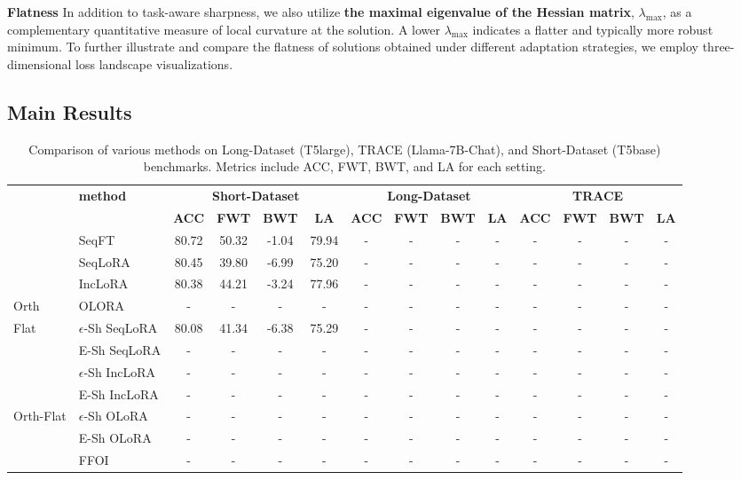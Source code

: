 \documentclass[letterpaper]{article} %
\begin{document}
\textbf{Flatness}
In addition to task-aware sharpness, we also utilize \textbf{the maximal eigenvalue of the Hessian matrix}, $\lambda_{\max}$, as a complementary quantitative measure of local curvature at the solution. A lower $\lambda_{\max}$ indicates a flatter and typically more robust minimum. To further illustrate and compare the flatness of solutions obtained under different adaptation strategies, we employ three-dimensional loss landscape visualizations\cite{liVisualizingLossLandscape2018}.

\subsection{Main Results}





\begin{table}[thbp]
\centering
\begin{tabular}{llcccccccccccc}
\toprule
 & \multirow{2}{*}{\textbf{method}} 
    & \multicolumn{4}{c}{\textbf{Short-Dataset}} 
    & \multicolumn{4}{c}{\textbf{Long-Dataset }}
    & \multicolumn{4}{c}{\textbf{TRACE}} \\
\cmidrule(lr){3-6} \cmidrule(lr){7-10} \cmidrule(lr){11-14}
 & & \textbf{ACC} & \textbf{FWT} & \textbf{BWT} & \textbf{LA}
   & \textbf{ACC} & \textbf{FWT} & \textbf{BWT} & \textbf{LA}
   & \textbf{ACC} & \textbf{FWT} & \textbf{BWT} & \textbf{LA} \\
\midrule
\multirow{3}{*}{} 
    & SeqFT       & 80.72 & 50.32 & -1.04 & 79.94 & - & - & - & - & - & - & - & - \\
    & SeqLoRA     & 80.45 & 39.80 & -6.99 & 75.20 & - & - & - & - & - & - & - & - \\
    & IncLoRA    & 80.38 & 44.21 & -3.24 & 77.96 & - & - & - & - & - & - & - & - \\
\midrule
\multirow{1}{*}{Orth} 
    & OLORA       & - & - & - & - & - & - & - & - & - & - & - & - \\
\midrule
\multirow{4}{*}{Flat} 
    &$\epsilon$-Sh SeqLoRA & 80.08 & 41.34 & -6.38 & 75.29 & - & - & - & - & - & - & - & - \\ 
    &E-Sh SeqLoRA & - & - & - & - & - & - & - & - & - & - & - & - \\
    &$\epsilon$-Sh IncLoRA & - & - & - & - & - & - & - & - & - & - & - & - \\ 
    &E-Sh IncLoRA & - & - & - & - & - & - & - & - & - & - & - & - \\
\midrule

\multirow{1}{*}{Orth-Flat} 
    & $\epsilon$-Sh OLoRA & - & - & - & - & - & - & - & - & - & - & - & - \\ 
    &E-Sh OLoRA & - & - & - & - & - & - & - & - & - & - & - & - \\
\midrule
\multirow{1}{*}{} 
    & {FFOI} & - & - & - & - & - & - & - & - & - & - & - & - \\
\bottomrule
\end{tabular}
\caption{Comparison of various methods on Long-Dataset (T5large), TRACE (Llama-7B-Chat), and Short-Dataset (T5base) benchmarks. Metrics include ACC, FWT, BWT, and LA for each setting.}
\label{tab:main_cl_benchmark}
\end{table}
\end{document}
